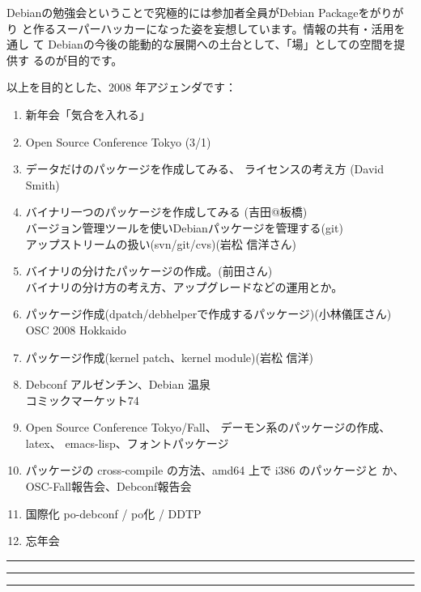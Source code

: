 \documentclass[mingoth,a4paper]{jsarticle}
\begin{document}
 Debianの勉強会ということで究極的には参加者全員がDebian Packageをがりがり
 と作るスーパーハッカーになった姿を妄想しています。情報の共有・活用を通し
 て Debianの今後の能動的な展開への土台として、「場」としての空間を提供す
 るのが目的です。

以上を目的とした、2008 年アジェンダです：
\begin{enumerate}
 \item 新年会「気合を入れる」
 \item Open Source Conference Tokyo (3/1)
 \item データだけのパッケージを作成してみる、
       ライセンスの考え方 (David Smith)
 \item バイナリ一つのパッケージを作成してみる (吉田@板橋)\\
       バージョン管理ツールを使いDebianパッケージを管理する(git)\\
       アップストリームの扱い(svn/git/cvs)(岩松 信洋さん)
 \item バイナリの分けたパッケージの作成。(前田さん)\\
       バイナリの分け方の考え方、アップグレードなどの運用とか。
 \item パッケージ作成(dpatch/debhelperで作成するパッケージ)(小林儀匡さん)\\
       OSC 2008 Hokkaido
 \item パッケージ作成(kernel patch、kernel module)(岩松 信洋)
 \item Debconf アルゼンチン、Debian 温泉 \\
       コミックマーケット74
 \item Open Source Conference Tokyo/Fall、
       デーモン系のパッケージの作成、latex、 emacs-lisp、フォントパッケージ
 \item パッケージの cross-compile の方法、amd64 上で i386 のパッケージと
       か、OSC-Fall報告会、Debconf報告会
 \item 国際化 po-debconf / po化 / DDTP
 \item 忘年会
\end{enumerate}


\newpage

\begin{minipage}[b]{0.2\hsize}
 \colorbox{titleback}{}
\end{minipage}
\begin{minipage}[b]{0.8\hsize}
\hrule
\vspace{2mm}
\hrule
\tableofcontents
\vspace{2mm}
\hrule
\end{minipage}
\end{document}
